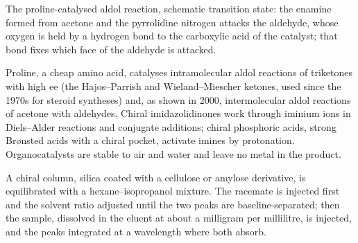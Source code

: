 \begin{omfigure}

{\small The proline-catalysed aldol reaction, schematic transition state: the
enamine formed from acetone and the pyrrolidine nitrogen attacks the aldehyde,
whose oxygen is held by a hydrogen bond to the carboxylic acid of the catalyst;
that bond fixes which face of the aldehyde is attacked.}
\end{omfigure}

Proline, a cheap amino acid, catalyses intramolecular aldol reactions of
triketones with high ee (the Hajos--Parrish and Wieland--Miescher ketones, used
since the 1970s for steroid syntheses) and, as shown in 2000, intermolecular
aldol reactions of acetone with aldehydes. Chiral imidazolidinones work through
iminium ions in Diels--Alder reactions and conjugate additions; chiral
phosphoric acids, strong Brønsted acids with a chiral pocket, activate imines
by protonation. Organocatalysts are stable to air and water and leave no metal
in the product.

\begin{inthelab}
A chiral column, silica coated with a cellulose or amylose derivative, is
equilibrated with a hexane--isopropanol mixture. The racemate is injected first
and the solvent ratio adjusted until the two peaks are baseline-separated; then
the sample, dissolved in the eluent at about a milligram per millilitre, is
injected, and the peaks integrated at a wavelength where both absorb.
\end{inthelab}

